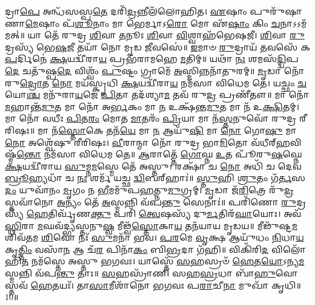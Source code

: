 𑌦𑍍𑌰𑌾\-\ul{𑌪𑍇} 𑌅𑌨𑍍𑌧᳴𑌸𑌸𑍍𑌪\-\ul{𑌤𑍇} 𑌦𑌰𑌿᳴\-\ul{𑌦𑍍𑌰}\-𑌨𑍍𑌨𑍀𑌲᳴𑌲𑍋𑌹𑌿𑌤। \ul{𑌏}\-𑌷𑌾𑌂 𑌪𑍁𑌰𑍁᳴𑌷𑌾𑌣𑌾\-\ul{𑌮𑍇}\-𑌷𑌾𑌂 𑌪᳴\-\ul{𑌶𑍂}\-𑌨𑌾𑌂 𑌮𑌾 𑌭𑍇𑌰𑍍𑌮𑌾𑌽\-\ul{𑌰𑍋} 𑌮𑍋 𑌏᳴\-\ul{𑌷𑌾𑌂} 𑌕𑌿𑌂 \ul{𑌚}\-𑌨𑌾𑌽𑌽𑌮᳴𑌮𑌤𑍍॥ 𑌯𑌾 𑌤𑍇᳴ 𑌰𑍁𑌦𑍍𑌰 \ul{𑌶𑌿}\-𑌵𑌾 \ul{𑌤}\-𑌨𑍂𑌃 \ul{𑌶𑌿}\-𑌵𑌾 \ul{𑌵𑌿}\-𑌶𑍍𑌵𑌾𑌹᳴𑌭𑍇𑌷𑌜𑍀। \ul{𑌶𑌿}\-𑌵𑌾 \ul{𑌰𑍁}\-𑌦𑍍𑌰𑌸𑍍𑌯᳴ 𑌭𑍇\-\ul{𑌷}\-𑌜𑍀 𑌤𑌯𑌾᳴ 𑌨𑍋 𑌮𑍃𑌡 \ul{𑌜𑍀}\-𑌵𑌸𑍇॑॥ \ul{𑌇}\-𑌮𑌾𑍞 \ul{𑌰𑍁}\-𑌦𑍍𑌰𑌾𑌯᳴ \ul{𑌤}\-𑌵𑌸𑍇᳴ 𑌕\-\ul{𑌪}\-𑌰𑍍𑌦𑌿𑌨𑍇॑ \ul{𑌕𑍍𑌷}\-𑌯𑌦𑍍𑌵𑍀᳴𑌰𑌾\-\ul{𑌯} 𑌪𑍍𑌰𑌭᳴𑌰𑌾𑌮𑌹𑍇 \ul{𑌮}\-𑌤𑌿𑌮𑍍॥ 𑌯𑌥𑌾᳴ \ul{𑌨𑌃} 𑌶𑌮𑌸᳴\-\ul{𑌦𑍍𑌦𑍍𑌵𑌿}\-𑌪\-\ul{𑌦𑍇} 𑌚𑌤𑍁᳴𑌷𑍍𑌪\-\ul{𑌦𑍇} 𑌵𑌿𑌶𑍍𑌵𑌂᳴ \ul{𑌪𑍁}\-𑌷𑍍𑌟𑌂 𑌗𑍍𑌰𑌾𑌮𑍇᳴ \ul{𑌅}\-𑌸𑍍𑌮𑌿𑌨𑍍𑌨𑌨𑌾᳴𑌤𑍁𑌰𑌮𑍍॥ \ul{𑌮𑍃}\-𑌡𑌾 𑌨𑍋᳴ 𑌰𑍁\-\ul{𑌦𑍍𑌰𑍋}\-𑌤 \ul{𑌨𑍋} 𑌮𑌯᳴𑌸𑍍𑌕𑍃𑌧𑌿 \ul{𑌕𑍍𑌷}\-𑌯𑌦𑍍𑌵𑍀᳴𑌰𑌾\-\ul{𑌯} 𑌨𑌮᳴𑌸𑌾 𑌵𑌿𑌧𑍇𑌮 𑌤𑍇। 𑌯𑌚𑍍𑌛𑌂 \ul{𑌚} 𑌯𑍋\-\ul{𑌶𑍍𑌚} 𑌮𑌨𑍁᳴𑌰𑌾\-\ul{𑌯}\-𑌜𑍇 \ul{𑌪𑌿}\-𑌤𑌾 𑌤𑌦᳴𑌶𑍍𑌯𑌾\-\ul{𑌮} 𑌤𑌵᳴ 𑌰𑍁\-\ul{𑌦𑍍𑌰} 𑌪𑍍𑌰𑌣𑍀᳴𑌤𑍗॥ 𑌮𑌾 𑌨𑍋᳴ \ul{𑌮}\-𑌹𑌾𑌨𑍍𑌤᳴\-\ul{𑌮𑍁}\-𑌤 𑌮𑌾 𑌨𑍋᳴ 𑌅\-\ul{𑌰𑍍𑌭}\-𑌕𑌂 𑌮𑌾 \ul{𑌨} 𑌉𑌕𑍍𑌷᳴𑌨𑍍𑌤\-\ul{𑌮𑍁}\-𑌤 𑌮𑌾 𑌨᳴ 𑌉\-\ul{𑌕𑍍𑌷𑌿}\-𑌤𑌮𑍍। 𑌮𑌾 𑌨𑍋᳴ 𑌵𑌧𑍀𑌃 \ul{𑌪𑌿}\-𑌤\-\ul{𑌰𑌂} 𑌮𑍋𑌤 \ul{𑌮𑌾}\-𑌤𑌰𑌂᳴ \ul{𑌪𑍍𑌰𑌿}\-𑌯𑌾 𑌮𑌾 𑌨᳴\-\ul{𑌸𑍍𑌤}\-𑌨𑍁𑌵𑍋᳴ 𑌰𑍁𑌦𑍍𑌰 𑌰𑍀𑌰𑌿𑌷𑌃॥ 𑌮𑌾 𑌨᳴\-\ul{𑌸𑍍𑌤𑍋}\-𑌕𑍇 𑌤𑌨᳴\-\ul{𑌯𑍇} 𑌮𑌾 \ul{𑌨} 𑌆𑌯𑍁᳴\-\ul{𑌷𑌿} 𑌮𑌾 \ul{𑌨𑍋} 𑌗𑍋\-\ul{𑌷𑍁} 𑌮𑌾 \ul{𑌨𑍋} 𑌅𑌶𑍍𑌵𑍇᳴𑌷𑍁 𑌰𑍀𑌰𑌿𑌷𑌃। \ul{𑌵𑍀}\-𑌰𑌾𑌨𑍍𑌮𑌾 𑌨𑍋᳴ 𑌰𑍁𑌦𑍍𑌰 𑌭𑌾\-\ul{𑌮𑌿}\-𑌤𑍋 𑌵᳴𑌧𑍀𑌰𑍍‌\-\ul{𑌹}\-𑌵𑌿𑌷𑍍𑌮᳴\-\ul{𑌨𑍍𑌤𑍋} 𑌨𑌮᳴𑌸𑌾 𑌵𑌿𑌧𑍇𑌮 𑌤𑍇॥ \ul{𑌆}\-𑌰𑌾𑌤𑍍𑌤𑍇᳴ \ul{𑌗𑍋}\-𑌘𑍍𑌨 \ul{𑌉}\-𑌤 𑌪𑍂᳴𑌰𑍁\-\ul{𑌷}\-𑌘𑍍𑌨𑍇 \ul{𑌕𑍍𑌷}\-𑌯𑌦𑍍𑌵𑍀᳴𑌰𑌾𑌯 \ul{𑌸𑍁}\-𑌮𑍍𑌨\-\ul{𑌮}\-𑌸𑍍𑌮𑍇 𑌤𑍇᳴ 𑌅𑌸𑍍𑌤𑍁। 𑌰𑌕𑍍𑌷𑌾᳴ 𑌚 \ul{𑌨𑍋} 𑌅𑌧𑌿᳴ 𑌚 𑌦𑍇𑌵 \ul{𑌬𑍍𑌰𑍂}\-𑌹𑍍𑌯𑌧𑌾᳴ 𑌚 \ul{𑌨𑌃} 𑌶𑌰𑍍𑌮᳴ 𑌯𑌚𑍍𑌛 \ul{𑌦𑍍𑌵𑌿}\-𑌬𑌰𑍍‌𑌹𑌾𑌃॑॥ \ul{𑌸𑍍𑌤𑍁}\-𑌹𑌿 \ul{𑌶𑍍𑌰𑍁}\-𑌤𑌂 𑌗᳴\-\ul{𑌰𑍍𑌤}\-𑌸\-\ul{𑌦𑌂} 𑌯𑍁𑌵𑌾᳴𑌨𑌂 \ul{𑌮𑍃}\-𑌗𑌂 𑌨 \ul{𑌭𑍀}\-𑌮𑌮𑍁᳴𑌪\-\ul{𑌹}\-𑌤𑍍𑌨𑍁\-\ul{𑌮𑍁}\-𑌗𑍍𑌰𑌮𑍍। \ul{𑌮𑍃}\-𑌡𑌾 𑌜᳴\-\ul{𑌰𑌿}\-𑌤𑍍𑌰𑍇 𑌰𑍁᳴\-\ul{𑌦𑍍𑌰} 𑌸𑍍𑌤𑌵𑌾᳴𑌨𑍋 \ul{𑌅}\-𑌨𑍍𑌯𑌂 𑌤𑍇᳴ \ul{𑌅}\-𑌸𑍍𑌮𑌨𑍍𑌨𑌿 𑌵᳴𑌪\-\ul{𑌨𑍍𑌤𑍁} 𑌸𑍇𑌨𑌾𑌃॑॥ 𑌪𑌰𑌿᳴𑌣𑍋 \ul{𑌰𑍁}\-𑌦𑍍𑌰𑌸𑍍𑌯᳴ \ul{𑌹𑍇}\-𑌤𑌿𑌰𑍍𑌵𑍃᳴𑌣\-\ul{𑌕𑍍𑌤𑍁} 𑌪𑌰𑌿᳴ \ul{𑌤𑍍𑌵𑍇}\-𑌷𑌸𑍍𑌯᳴ 𑌦𑍁\-\ul{𑌰𑍍𑌮}\-𑌤𑌿𑌰᳴\-\ul{𑌘𑌾}\-𑌯𑍋𑌃। 𑌅𑌵᳴ \ul{𑌸𑍍𑌥𑌿}\-𑌰𑌾 \ul{𑌮}\-𑌘𑌵᳴𑌦𑍍𑌭𑍍𑌯𑌸𑍍𑌤𑌨𑍁\-\ul{𑌷𑍍𑌵} 𑌮𑍀𑌢𑍍𑌵᳴\-\ul{𑌸𑍍𑌤𑍋}\-𑌕𑌾\-\ul{𑌯} 𑌤𑌨᳴𑌯𑌾𑌯 𑌮𑍃𑌡𑌯॥ 𑌮𑍀𑌢𑍁᳴𑌷𑍍𑌟\-\ul{𑌮} 𑌶𑌿𑌵᳴𑌤𑌮 \ul{𑌶𑌿}\-𑌵𑍋 𑌨𑌃᳴ \ul{𑌸𑍁}\-𑌮𑌨𑌾᳴ 𑌭𑌵। \ul{𑌪}\-\-\ul{𑌰}\-𑌮𑍇 \ul{𑌵𑍃}\-𑌕𑍍𑌷 𑌆𑌯𑍁᳴𑌧𑌂 \ul{𑌨𑌿}\-𑌧𑌾\-\ul{𑌯} 𑌕𑍃\-\ul{𑌤𑍍𑌤𑌿𑌂} 𑌵𑌸𑌾᳴\-\ul{𑌨} 𑌆 𑌚᳴\-\ul{𑌰} 𑌪𑌿𑌨𑌾᳴\-\ul{𑌕𑌂} 𑌬𑌿\-\ul{𑌭𑍍𑌰}\-𑌦𑌾 𑌗᳴𑌹𑌿॥ 𑌵𑌿𑌕𑌿᳴𑌰𑌿\-\ul{𑌦} 𑌵𑌿𑌲𑍋᳴𑌹𑌿\-\ul{𑌤} 𑌨𑌮᳴𑌸𑍍𑌤𑍇 𑌅𑌸𑍍𑌤𑍁 𑌭𑌗𑌵𑌃। 𑌯𑌾𑌸𑍍𑌤𑍇᳴ \ul{𑌸}\-𑌹𑌸𑍍𑌰𑍞᳴ \ul{𑌹𑍇}\-𑌤\-\ul{𑌯𑍋}\-𑌽𑌨𑍍𑌯\-\ul{𑌮}\-𑌸𑍍𑌮𑌨𑍍𑌨𑌿 𑌵᳴𑌪\-\ul{𑌨𑍍𑌤𑍁} 𑌤𑌾𑌃॥ \ul{𑌸}\-𑌹𑌸𑍍𑌰𑌾᳴𑌣𑌿 𑌸𑌹\-\ul{𑌸𑍍𑌰}\-𑌧𑌾 𑌬𑌾᳴\-\ul{𑌹𑍁}\-𑌵𑍋𑌸𑍍𑌤𑌵᳴ \ul{𑌹𑍇}\-𑌤𑌯𑌃᳴। 𑌤𑌾\-\ul{𑌸𑌾}\-𑌮𑍀𑌶𑌾᳴𑌨𑍋 𑌭𑌗𑌵𑌃 𑌪\-\ul{𑌰𑌾}\-𑌚𑍀\-\ul{𑌨𑌾} 𑌮𑍁𑌖𑌾᳴ 𑌕𑍃𑌧𑌿॥10॥

